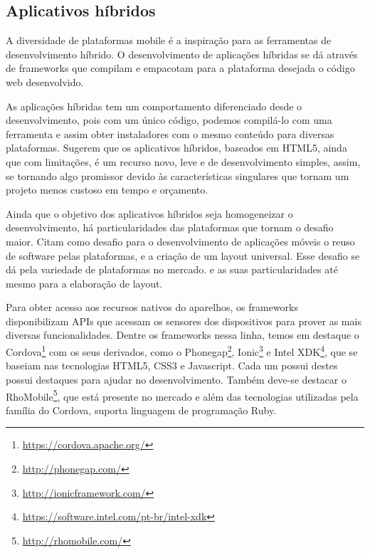 \subsection{Aplicativos híbridos}\label{sub_sec:hybrid_apps}


A diversidade de plataformas mobile é a inspiração para as ferramentas de desenvolvimento híbrido. O desenvolvimento de aplicações híbridas se dá através de frameworks que compilam e empacotam para a plataforma desejada o código web desenvolvido. 


As aplicações híbridas tem um comportamento diferenciado desde o desenvolvimento, pois com um único código, podemos compilá-lo com uma ferramenta e assim obter instaladores com o mesmo conteúdo para diversas plataformas. \cite{6530464} Sugerem que os aplicativos híbridos, baseados em HTML5, ainda que com limitações, é um recurso novo, leve e de desenvolvimento simples, assim, se tornando algo promissor devido às características singulares que tornam um projeto menos custoso em tempo e orçamento.


Ainda que o objetivo dos aplicativos híbridos seja homogeneizar o desenvolvimento, há particularidades das plataformas que tornam o desafio maior. \cite{dehlinger2011mobile} Citam como desafio para o desenvolvimento de aplicações móveis o reuso de software pelas plataformas, e a criação de um layout universal. Esse desafio se dá pela variedade de plataformas no mercado. e as suas particularidades até mesmo para a elaboração de layout.


Para obter acesso aos recursos nativos do aparelhos, os frameworks disponibilizam APIs que acessam os sensores dos dispositivos para prover as mais diversas funcionalidades. Dentre os frameworks nessa linha, temos em destaque o Cordova\footnote{\url{https://cordova.apache.org/}} com os seus derivados, como o Phonegap\footnote{\url{http://phonegap.com/}}, Ionic\footnote{\url{http://ionicframework.com/}} e Intel XDK\footnote{\url{https://software.intel.com/pt-br/intel-xdk}}, que se baseiam nas tecnologias HTML5, CSS3 e Javascript. Cada um possui destes possui destaques para ajudar no desenvolvimento. Também deve-se destacar o RhoMobile\footnote{\url{http://rhomobile.com/}}, que está  presente no mercado e além das tecnologias utilizadas pela família do Cordova, suporta linguagem de programação Ruby.




